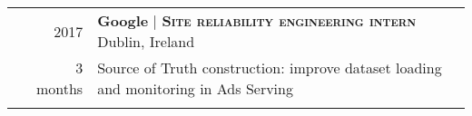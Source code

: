 \documentclass[a4paper,10pt]{article} %
\begin{document}
\begin{tabularx}{\textwidth}{p{0.19cm}r|X}
                                                 & 2017                                                                                                                                        & \textbf{\large Google} \hspace{0.2cm} | \hspace{0.01cm} \textbf{\textsc{Site reliability engineering intern}} \hfill Dublin, Ireland                  \\
                                                 & 3 months                                                                                                                                    & Source of Truth construction: improve dataset loading and monitoring in Ads Serving                                                          \\
    \multicolumn{2}{c}{\vspace{-0.2cm}}                                                                                                                                                                                                                                                                                                       \\


\end{tabularx}
\end{document}
